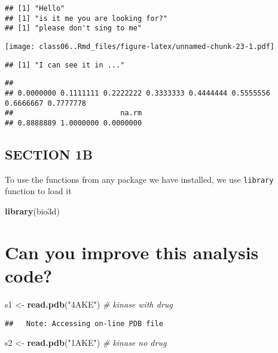 \documentclass[]{article}
\newenvironment{Shaded}{\begin{snugshade}}{\end{snugshade}}
\newcommand{\CommentTok}[1]{\textcolor[rgb]{0.56,0.35,0.01}{\textit{#1}}}
\newcommand{\KeywordTok}[1]{\textcolor[rgb]{0.13,0.29,0.53}{\textbf{#1}}}
\newcommand{\NormalTok}[1]{#1}
\newcommand{\StringTok}[1]{\textcolor[rgb]{0.31,0.60,0.02}{#1}}
\begin{document}
\begin{verbatim}
## [1] "Hello"
## [1] "is it me you are looking for?"
## [1] "please don't sing to me"
\end{verbatim}

\texttt{[image: class06..Rmd\_files/figure-latex/unnamed-chunk-23-1.pdf]}

\begin{verbatim}
## [1] "I can see it in ..."
\end{verbatim}

\begin{verbatim}
##                                                                                 
## 0.0000000 0.1111111 0.2222222 0.3333333 0.4444444 0.5555556 0.6666667 0.7777778 
##                         na.rm 
## 0.8888889 1.0000000 0.0000000
\end{verbatim}

\hypertarget{section-1b}{%
\subsection{SECTION 1B}\label{section-1b}}

To use the functions from any package we have installed, we use
\texttt{library} function to load it

\begin{Shaded}
\begin{Highlighting}[]
\KeywordTok{library}\NormalTok{(bio3d)}
\end{Highlighting}
\end{Shaded}

\hypertarget{can-you-improve-this-analysis-code}{%
\section{Can you improve this analysis
code?}\label{can-you-improve-this-analysis-code}}

\begin{Shaded}
\begin{Highlighting}[]
\NormalTok{s1 <-}\StringTok{ }\KeywordTok{read.pdb}\NormalTok{(}\StringTok{"4AKE"}\NormalTok{) }\CommentTok{# kinase with drug}
\end{Highlighting}
\end{Shaded}

\begin{verbatim}
##   Note: Accessing on-line PDB file
\end{verbatim}

\begin{Shaded}
\begin{Highlighting}[]
\NormalTok{s2 <-}\StringTok{ }\KeywordTok{read.pdb}\NormalTok{(}\StringTok{"1AKE"}\NormalTok{) }\CommentTok{# kinase no drug}
\end{Highlighting}
\end{Shaded}
\end{document}
